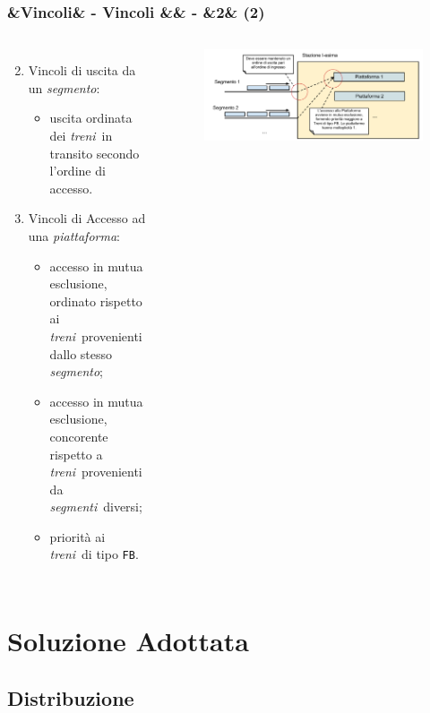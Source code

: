 \documentclass[slidestop,compress,blackandwhite]{beamer}
\newcommand{\ttt}[1]{\texttt{#1}}
\newcommand{\ii}[1]{\textit{#1}}
\newcommand{\treni}{\ii{treni}}
\newcommand{\piattaforma}{\ii{piattaforma}}
\newcommand{\segmento}{\ii{segmento}}
\newcommand{\segmenti}{\ii{segmenti}}
\newcommand{\newtitle}[4]{
	#1 
	\ifx&#2&%
	\else
  		\large- #2
	\fi
	\ifx&#3&%
	\else
  		\normalsize- #3
	\fi
	\ifx&#4&%
	\else
  		\normalsize (#4)
	\fi
}
\newcommand{\newframe}[5]{
	\begin{frame}
		\frametitle{\newtitle{#1}{#2}{#3}{#4}}
		#5
	\end{frame}
}
\newcommand{\myitemize}[1]{\begin{itemize}#1\end{itemize}}
\begin{document}
	\newframe{}{Vincoli}{}{2}{
		\begin{columns}[c]
		\column{0.6\textwidth}
		\begin{enumerate}
			\setcounter{enumi}{1}
			\item Vincoli di uscita da un \segmento:
				\myitemize{
					\item uscita ordinata dei \treni~in transito secondo l'ordine di accesso.
				}
			\item Vincoli di Accesso ad una \piattaforma:
				\myitemize{
					\item accesso in mutua esclusione, ordinato rispetto ai \treni~provenienti dallo stesso \segmento;
					\item accesso in mutua esclusione, concorente rispetto a \treni~provenienti da \segmenti~diversi;
					\item priorità ai \treni~di tipo \ttt{FB}.
				}
		\end{enumerate}
		\column{0.5\textwidth}
		\begin{figure}
			\includegraphics[scale=0.27,trim=30mm 0mm 0mm 0mm]{imgs/Ingresso_Stazione.pdf}
		\end{figure}
		\end{columns}
	}
	
	

\section{Soluzione Adottata}\label{sol}
	
	\subsection{Distribuzione}\label{sol_distr}
	
\end{document}
